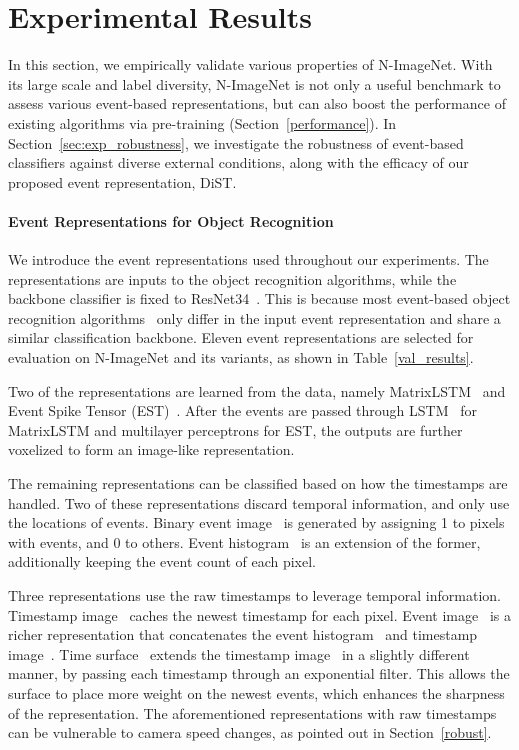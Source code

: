 \section{Experimental Results}
\label{exp}

In this section, we empirically validate various properties of N-ImageNet.
With its large scale and label diversity, N-ImageNet is not only a useful benchmark to assess various event-based representations, but can also boost the performance of existing algorithms via pre-training (Section~\ref{performance}).
In Section~\ref{sec:exp_robustness}, we investigate the robustness of event-based classifiers against diverse external conditions, along with the efficacy of our proposed event representation, DiST.

\paragraph{Event Representations for Object Recognition}
We introduce the event representations used throughout our experiments.
The representations are inputs to the object recognition algorithms, while the backbone classifier is fixed to ResNet34~\cite{resnet}.
This is because most event-based object recognition algorithms~\cite{est, matrix_lstm} only differ in the input event representation and share a similar classification backbone.
Eleven event representations are selected for evaluation on N-ImageNet and its variants, as shown in Table~\ref{val_results}.

Two of the representations are learned from the data, namely MatrixLSTM~\cite{matrix_lstm} and Event Spike Tensor (EST)~\cite{est}.
After the events are passed through LSTM~\cite{lstm} for MatrixLSTM and multilayer perceptrons for EST, the outputs are further voxelized to form an image-like representation.

The remaining representations can be classified based on how the timestamps are handled.
Two of these representations discard temporal information, and only use the locations of events.
Binary event image~\cite{binary_image_2, gesture_1} is generated by assigning 1 to pixels with events, and 0 to others.
Event histogram~\cite{event_driving} is an extension of the former, additionally keeping the event count of each pixel.

Three representations use the raw timestamps to leverage temporal information.
Timestamp image~\cite{timestamp_image} caches the newest timestamp for each pixel.
Event image~\cite{ev_gait, evflownet} is a richer representation that concatenates the event histogram~\cite{event_driving} and timestamp image~\cite{timestamp_image}.
Time surface~\cite{hots} extends the timestamp image~\cite{timestamp_image} in a slightly different manner, by passing each timestamp through an exponential filter.
This allows the surface to place more weight on the newest events, which enhances the sharpness of the representation.
The aforementioned representations with raw timestamps can be vulnerable to camera speed changes, as pointed out in Section~\ref{robust}.

